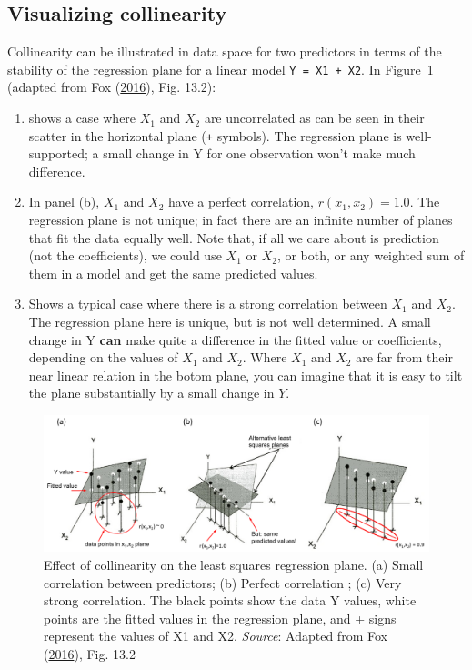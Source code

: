 \documentclass[
  letterpaper,
  10pt,
  krantz2]{krantz}
\begin{document}
\hypertarget{visualizing-collinearity}{%
\subsection{Visualizing collinearity}\label{visualizing-collinearity}}

Collinearity can be illustrated in data space for two predictors in
terms of the stability of the regression plane for a linear model
\texttt{Y\ =\ X1\ +\ X2}. In Figure~\ref{fig-collin-demo} (adapted from
Fox (\protect\hyperlink{ref-Fox:2016:ARA}{2016}), Fig. 13.2):

\begin{enumerate}
\def\labelenumi{(\alph{enumi})}
\item
  shows a case where \(X_1\) and \(X_2\) are uncorrelated as can be seen
  in their scatter in the horizontal plane (\texttt{+} symbols). The
  regression plane is well-supported; a small change in Y for one
  observation won't make much difference.
\item
  In panel (b), \(X_1\) and \(X_2\) have a perfect correlation,
  \(r (x_1, x_2) = 1.0\). The regression plane is not unique; in fact
  there are an infinite number of planes that fit the data equally well.
  Note that, if all we care about is prediction (not the coefficients),
  we could use \(X_1\) or \(X_2\), or both, or any weighted sum of them
  in a model and get the same predicted values.
\item
  Shows a typical case where there is a strong correlation between
  \(X_1\) and \(X_2\). The regression plane here is unique, but is not
  well determined. A small change in Y \textbf{can} make quite a
  difference in the fitted value or coefficients, depending on the
  values of \(X_1\) and \(X_2\). Where \(X_1\) and \(X_2\) are far from
  their near linear relation in the botom plane, you can imagine that it
  is easy to tilt the plane substantially by a small change in \(Y\).
\end{enumerate}

\begin{figure}

{\centering \includegraphics[width=1\textwidth,height=\textheight]{images/collin-demo.png}

}

\caption{\label{fig-collin-demo}Effect of collinearity on the least
squares regression plane. (a) Small correlation between predictors; (b)
Perfect correlation ; (c) Very strong correlation. The black points show
the data Y values, white points are the fitted values in the regression
plane, and + signs represent the values of X1 and X2. \emph{Source}:
Adapted from Fox (\protect\hyperlink{ref-Fox:2016:ARA}{2016}), Fig.
13.2}

\end{figure}
\end{document}
